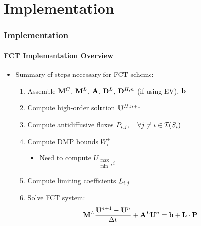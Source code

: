 \documentclass{beamer}
\begin{document}
\section{Implementation}
\begin{frame}
\frametitle{Implementation}
\framesubtitle{FCT Implementation Overview}

\begin{itemize}
   \item Summary of steps necessary for FCT scheme:
      \begin{enumerate}
         \item Assemble $\mathbf{M}^C$, $\mathbf{M}^L$,
           $\ssmatrix$, $\diffusionmatrix^L$, $\diffusionmatrix^{H,n}$
           (if using EV), $\ssrhs$
         \item Compute high-order solution $\mathbf{U}^{H,n+1}$
         \item Compute antidiffusive fluxes $\correctionfluxij,\quad\forall j\ne i
            \in\mathcal{I}(S_i)$
         \item Compute DMP bounds $W_i^\pm$
            \begin{itemize}
               \item Need to compute $U_{\substack{\max\\\min},i}$
            \end{itemize}
         \item Compute limiting coefficients $L_{i,j}$
         \item Solve FCT system:
            \begin{equation}
              \lumpedmassmatrix\frac{\solutionvector^{n+1}
                -\solutionvector^n}{\dt} + \ssmatrix^L\solutionvector^n =
                \ssrhs + \limitermatrix\cdot\correctionfluxmatrix
            \end{equation}
      \end{enumerate}
\end{itemize}

\end{frame}
\end{document}
